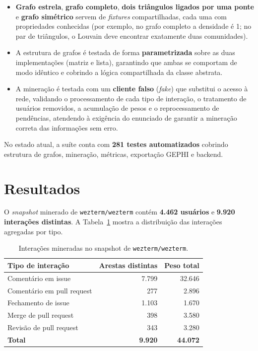\documentclass[12pt]{article}
\begin{document}
\begin{itemize}
  \item \textbf{Grafo estrela}, \textbf{grafo completo}, \textbf{dois triângulos
        ligados por uma ponte} e \textbf{grafo simétrico} servem de
        \emph{fixtures} compartilhadas, cada uma com propriedades conhecidas (por
        exemplo, no grafo completo a densidade é 1; no par de triângulos, o
        Louvain deve encontrar exatamente duas comunidades).
  \item A estrutura de grafos é testada de forma \textbf{parametrizada} sobre as
        duas implementações (matriz e lista), garantindo que ambas se comportam
        de modo idêntico e cobrindo a lógica compartilhada da classe abstrata.
  \item A mineração é testada com um \textbf{cliente falso} (\emph{fake}) que
        substitui o acesso à rede, validando o processamento de cada tipo de
        interação, o tratamento de usuários removidos, a acumulação de pesos e o
        reprocessamento de pendências, atendendo à exigência do enunciado de
        garantir a mineração correta das informações sem erro.
\end{itemize}

No estado atual, a suíte conta com \textbf{281 testes automatizados} cobrindo
estrutura de grafos, mineração, métricas, exportação GEPHI e backend.

\section{Resultados}
\label{sec:resultados}

O \emph{snapshot} minerado de \texttt{wezterm/wezterm} contém \textbf{4.462
usuários} e \textbf{9.920 interações distintas}. A Tabela~\ref{tab:interacoes}
mostra a distribuição das interações agregadas por tipo.

\begin{table}[ht]
\centering
\caption{Interações mineradas no snapshot de \texttt{wezterm/wezterm}.}
\label{tab:interacoes}
\small
\begin{tabular}{lrr}
\toprule
\textbf{Tipo de interação} & \textbf{Arestas distintas} & \textbf{Peso total} \\
\midrule
Comentário em issue & 7.799 & 32.646 \\
Comentário em pull request & 277 & 2.896 \\
Fechamento de issue & 1.103 & 1.670 \\
Merge de pull request & 398 & 3.580 \\
Revisão de pull request & 343 & 3.280 \\
\midrule
\textbf{Total} & \textbf{9.920} & \textbf{44.072} \\
\bottomrule
\end{tabular}
\end{table}
\end{document}
